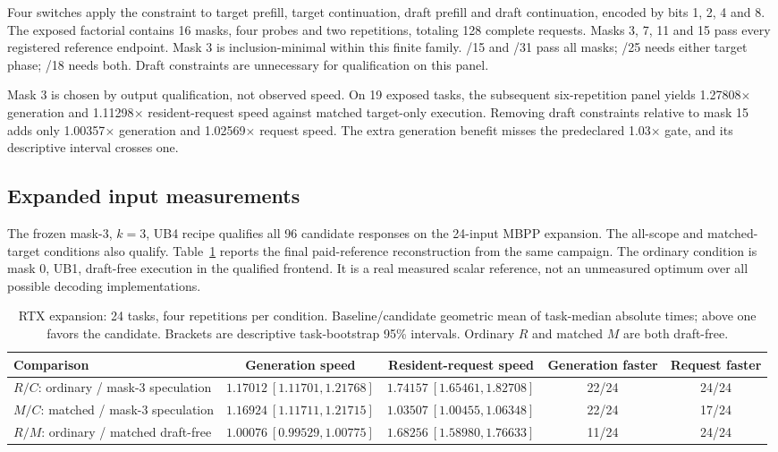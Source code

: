 \documentclass{article}
\begin{document}
Four switches apply the constraint to target prefill, target continuation, draft prefill and draft continuation, encoded by bits 1, 2, 4 and 8. The exposed factorial contains 16 masks, four probes and two repetitions, totaling 128 complete requests. Masks 3, 7, 11 and 15 pass every registered reference endpoint. Mask 3 is inclusion-minimal within this finite family. /15 and /31 pass all masks; /25 needs either target phase; /18 needs both. Draft constraints are unnecessary for qualification on this panel. 

Mask 3 is chosen by output qualification, not observed speed. On 19 exposed tasks, the subsequent six-repetition panel yields 1.27808$\times$ generation and 1.11298$\times$ resident-request speed against matched target-only execution. Removing draft constraints relative to mask 15 adds only 1.00357$\times$ generation and 1.02569$\times$ request speed. The extra generation benefit misses the predeclared 1.03$\times$ gate, and its descriptive interval crosses one. 

\subsection{Expanded input measurements}
The frozen mask-3, $k=3$, UB4 recipe qualifies all 96 candidate responses on the 24-input MBPP expansion. The all-scope and matched-target conditions also qualify. Table~\ref{tab:cost} reports the final paid-reference reconstruction from the same campaign. The ordinary condition is mask 0, UB1, draft-free execution in the qualified frontend. It is a real measured scalar reference, not an unmeasured optimum over all possible decoding implementations.

\begin{table}[t]
\centering\small\setlength{\tabcolsep}{3pt}
\caption{RTX expansion: 24 tasks, four repetitions per condition. Baseline/candidate geometric mean of task-median absolute times; above one favors the candidate. Brackets are descriptive task-bootstrap 95\% intervals. Ordinary $R$ and matched $M$ are both draft-free.}
\label{tab:cost}
\begin{tabular}{lcccc}\toprule
Comparison & Generation speed & Resident-request speed & Generation faster & Request faster\\\midrule
$R/C$: ordinary / mask-3 speculation & $1.17012\ [1.11701,1.21768]$ & $1.74157\ [1.65461,1.82708]$ & 22/24 & 24/24\\
$M/C$: matched / mask-3 speculation & $1.16924\ [1.11711,1.21715]$ & $1.03507\ [1.00455,1.06348]$ & 22/24 & 17/24\\
$R/M$: ordinary / matched draft-free & $1.00076\ [0.99529,1.00775]$ & $1.68256\ [1.58980,1.76633]$ & 11/24 & 24/24\\\bottomrule
\end{tabular}
\end{table}
\end{document}
